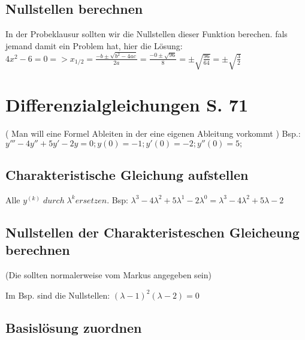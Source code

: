 \documentclass[a4paper, 11pt]{article}
\begin{document}
\subsection {Nullstellen berechnen}

In der Probeklausur sollten wir die Nullstellen dieser Funktion berechen. \newline
fals jemand damit ein Problem hat, hier die Lösung: \newline
\newline $ 4x^2 - 6 = 0 => x_{1/2}= \frac{-b\pm \sqrt{b^2-4ac}}{2a}=\frac{-0\pm
\sqrt{96}}{8}= \pm \sqrt{\frac{96}{64}}=\pm \sqrt{\frac{3}{2}}$

\section {Differenzialgleichungen S. 71}

( Man will eine Formel Ableiten in der eine eigenen Ableitung vorkommt )\newline
\newline Bsp.: $ y''' - 4y'' +5y' -2y = 0 ; y(0) = -1; y'(0) = -2; y''(0) = 5;$

\subsection { Charakteristische Gleichung aufstellen} 
Alle $y^{(k)}\; durch \; \lambda^k ersetzen.$\newline
\newline Bsp: $ \lambda^3 - 4 \lambda^2 + 5 \lambda^1 - 2\lambda^0 = \lambda^3 - 4 \lambda^2 + 5 \lambda - 2$
\subsection {Nullstellen der Charakteristeschen Gleicheung berechnen}

(Die sollten normalerweise vom Markus angegeben sein) \newline
\newline

Im Bsp. sind die Nullstellen: $ (\lambda - 1)^2 (\lambda - 2) = 0 $

\subsection {Basislösung zuordnen}
\end{document}
